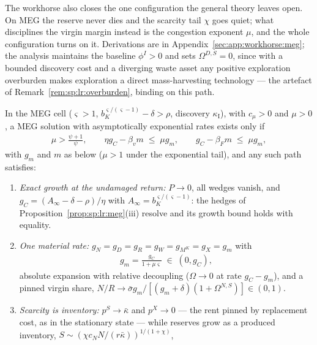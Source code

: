  The workhorse also closes the
one configuration the general theory leaves open. On MEG the reserve never dies and the
scarcity tail $\chi$ goes quiet; what disciplines the virgin margin instead is the congestion
exponent $\mu$, and the whole configuration turns on it. Derivations are in
Appendix~\ref{sec:app:workhorse:meg}; the analysis maintains the baseline $\phi^I>0$ and sets
$\Omega^{D,S}=0$, since with a bounded discovery cost and a diverging waste asset any positive
exploration overburden makes exploration a direct mass-harvesting technology --- the artefact
of Remark~\ref{rem:sp:lr:overburden}, binding on this path.

\begin{proposition}\label{prop:sp:wh:meg}
In the MEG cell ($\varsigma>1$, $b_K^{\varsigma/\left(\varsigma-1\right)}-\delta>\rho$,
discovery $\kappa_{\mathrm I}$), with $c_\mu>0$ and $\mu>0$, a MEG solution with
asymptotically exponential rates exists only if
\begin{align}
\mu>\frac{\psi+1}{\psi},
\qquad
\eta g_C-\beta_vm\;\le\;\mu g_m,
\qquad
g_C-\beta_Fm\;\le\;\mu g_m,
\label{eq:sp:wh:meg-conditions}
\end{align}
with $g_m$ and $m$ as below ($\mu>1$ under the exponential tail), and any such path
satisfies:
\begin{enumerate}
    \item \emph{Exact growth at the undamaged return:} $P\to0$, all wedges vanish, and
    $g_C=\left(A_\infty-\delta-\rho\right)/\eta$ with
    $A_\infty=b_K^{\varsigma/\left(\varsigma-1\right)}$: the hedges of
    Proposition~\ref{prop:sp:lr:meg}(iii) resolve and its growth bound holds with equality.
    \item \emph{One material rate:} $g_N=g_D=g_R=g_W=g_{M^K}=g_X=g_m$ with
    \begin{align}
    g_m=\frac{g_C}{1+\mu\varsigma}\;\in\;\left(0,g_C\right),
    \label{eq:sp:wh:gm}
    \end{align}
    absolute expansion with relative decoupling ($\Omega\to0$ at rate $g_C-g_m$), and a
    pinned virgin share,
    $N/R\to\bar\sigma g_m/\left[\left(g_m+\delta\right)\left(1+\Omega^{N,S}\right)\right]
    \in\left(0,1\right)$.
    \item \emph{Scarcity is inventory:} $p^S\to\bar\kappa$ and $p^X\to0$ --- the rent pinned
    by replacement cost, as in the stationary state --- while reserves grow as a produced
    inventory, $S\sim\left(\chi c_NN/\left(r\bar\kappa\right)\right)^{1/\left(1+\chi\right)}$,

\end{enumerate}
\end{proposition}
